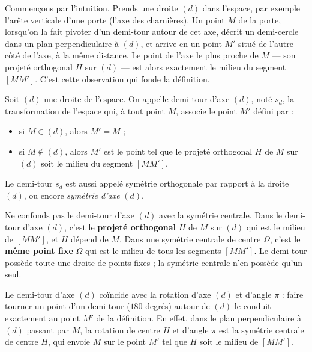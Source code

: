 \documentclass[11pt]{article}
\newcommand{\cle}[1]{{\popxbold\color{popdark}#1}}
\newcounter{popsec}
\newcounter{popsub}
\newcommand{\courssub}[1]{%
  \stepcounter{popsub}%
  \par\vspace{9pt}\noindent{\popxbold\fontsize{11.5}{13}\selectfont\color{popink}{\color{poporange}\thepopsec.\thepopsub}\hspace{6pt}#1}\par\nopagebreak\vspace{4pt}
}
\begin{document}
\courssub{Définition du demi-tour}

Commençons par l'intuition. Prends une droite $(d)$ dans l'espace, par exemple l'arête verticale d'une porte (l'axe des charnières). Un point $M$ de la porte, lorsqu'on la fait pivoter d'un demi-tour autour de cet axe, décrit un demi-cercle dans un plan perpendiculaire à $(d)$, et arrive en un point $M'$ situé de l'autre côté de l'axe, à la même distance. Le point de l'axe le plus proche de $M$ — son projeté orthogonal $H$ sur $(d)$ — est alors exactement le milieu du segment $[MM']$. C'est cette observation qui fonde la définition.

\begin{definition}
Soit $(d)$ une droite de l'espace. On appelle \cle{demi-tour} d'axe $(d)$, noté $s_d$, la transformation de l'espace qui, à tout point $M$, associe le point $M'$ défini par :
\begin{itemize}
\item si $M \in (d)$, alors $M' = M$ ;
\item si $M \notin (d)$, alors $M'$ est le point tel que le projeté orthogonal $H$ de $M$ sur $(d)$ soit le milieu du segment $[MM']$.
\end{itemize}
Le demi-tour $s_d$ est aussi appelé \cle{symétrie orthogonale par rapport à la droite} $(d)$, ou encore \emph{symétrie d'axe} $(d)$.
\end{definition}

\begin{attention}
Ne confonds pas le demi-tour d'axe $(d)$ avec la symétrie centrale. Dans le demi-tour d'axe $(d)$, c'est le \textbf{projeté orthogonal} $H$ de $M$ sur $(d)$ qui est le milieu de $[MM']$, et $H$ dépend de $M$. Dans une symétrie centrale de centre $\Omega$, c'est le \textbf{même point fixe} $\Omega$ qui est le milieu de tous les segments $[MM']$. Le demi-tour possède toute une droite de points fixes ; la symétrie centrale n'en possède qu'un seul.
\end{attention}

\begin{propriete}
Le demi-tour d'axe $(d)$ coïncide avec la rotation d'axe $(d)$ et d'angle $\pi$ : faire tourner un point d'un demi-tour ($180$ degrés) autour de $(d)$ le conduit exactement au point $M'$ de la définition. En effet, dans le plan perpendiculaire à $(d)$ passant par $M$, la rotation de centre $H$ et d'angle $\pi$ est la symétrie centrale de centre $H$, qui envoie $M$ sur le point $M'$ tel que $H$ soit le milieu de $[MM']$.
\end{propriete}
\end{document}
